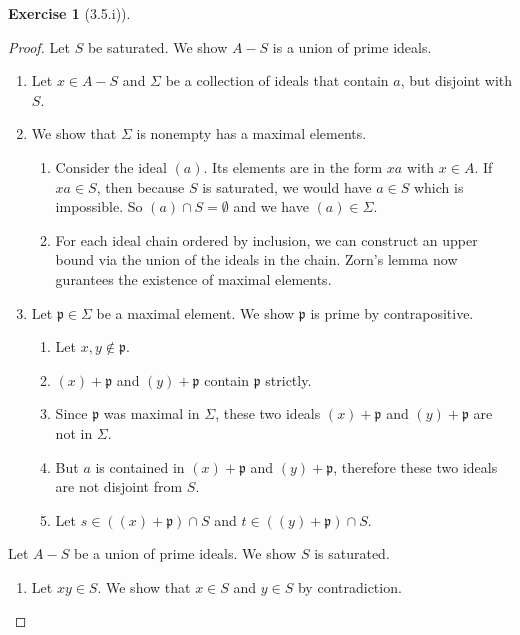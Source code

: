 \documentclass{book}
\theoremstyle{plain}
\theoremstyle{definition}
\newtheorem{exr}[thm]{Exercise}
\theoremstyle{custom_definition}
\begin{document}
\begin{exr}[3.5.i)]
\end{exr}
\begin{proof}
    Let \(S\) be saturated. We show \(A - S\) is a union of prime ideals.
    \begin{enumerate}
        \item Let \(x \in A - S\) and \(\Sigma\) be a collection of ideals that contain \(a\), but disjoint with \(S\).
        \item We show that \(\Sigma\) is nonempty has a maximal elements.
        \begin{enumerate}
            \item Consider the ideal \((a)\). Its elements are in the form \(xa\) with \(x \in A\). If \(xa \in S\), then because \(S\) is saturated, we would have \(a \in S\) which is impossible. So \((a) \cap S = \emptyset\) and we have \((a) \in \Sigma\).
            \item For each ideal chain ordered by inclusion, we can construct an upper bound via the union of the ideals in the chain. Zorn's lemma now gurantees the existence of maximal elements.
        \end{enumerate}
        \item Let \(\mathfrak{p} \in \Sigma\) be a maximal element. We show \(\mathfrak{p}\) is prime by contrapositive.
        \begin{enumerate}
            \item Let \(x, y \not\in \mathfrak{p}\).
            \item \((x) + \mathfrak{p}\) and \((y) + \mathfrak{p}\) contain \(\mathfrak{p}\) strictly.
            \item Since \(\mathfrak{p}\) was maximal in \(\Sigma\), these two ideals \((x) + \mathfrak{p}\) and \((y) + \mathfrak{p}\) are not in \(\Sigma\).
            \item But \(a\) is contained in \((x) + \mathfrak{p}\) and \((y) + \mathfrak{p}\), therefore these two ideals are not disjoint from \(S\).
            \item Let \(s \in ((x) + \mathfrak{p}) \cap S\) and \(t \in ((y) + \mathfrak{p}) \cap S\).
        \end{enumerate}
    \end{enumerate}
%
    Let \(A - S\) be a union of prime ideals. We show \(S\) is saturated.
    \begin{enumerate}
        \item Let \(xy \in S\). We show that \(x \in S\) and \(y \in S\) by contradiction.

\end{enumerate}
\end{proof}
\end{document}
